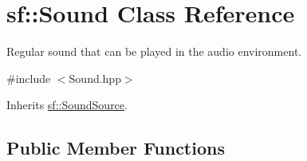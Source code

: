 \hypertarget{classsf_1_1_sound}{\section{sf\+:\+:Sound Class Reference}
\label{classsf_1_1_sound}
}


Regular sound that can be played in the audio environment.  




{\ttfamily \#include $<$Sound.\+hpp$>$}



Inherits \hyperlink{classsf_1_1_sound_source}{sf\+::\+Sound\+Source}.

\subsection*{Public Member Functions}
